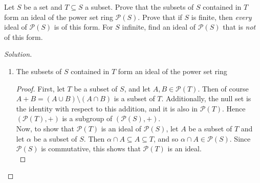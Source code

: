 \documentclass[12pt]{article}
\newenvironment{problem}[2][Problem]{\begin{trivlist}
\item[\hskip \labelsep {\bfseries #1}\hskip \labelsep {\bfseries #2.}]}{\end{trivlist}}
\newenvironment{solution}
  {\renewcommand\qedsymbol{$\blacksquare$}\begin{proof}[Solution]}
{\end{proof}}
\newenvironment{sproof}{
  \renewcommand\qedsymbol{$\square$}
  \begin{proof}
  }{
  \end{proof}
}
\theoremstyle{remark}
\begin{document}
\begin{problem}{3.16}
  Let $S$ be a set and $T\subseteq S$ a subset.
  Prove that the subsets of $S$ contained in $T$ form an ideal of the power set ring 
  $\mathscr{P}(S)$.
  Prove that if $S$ is finite, then \textit{every} ideal of $\mathscr{P}(S)$ is of this form.
  For $S$ infinite, find an ideal of $\mathscr{P}(S)$ that is \textit{not} of this form.
\end{problem}

\begin{solution}\ 
  \begin{enumerate}
    \item The subsets of $S$ contained in $T$ form an ideal of the power set ring 
      \begin{sproof}
        First, let $T$ be a subset of $S$, and let $A,B\in\mathscr{P}(T)$.
        Then of course \\$A+B=(A\cup B)\setminus(A\cap B)$ is a subset of $T$.
        Additionally, the null set is the identity with respect to this addition, and
        it is also in $\mathscr{P}(T)$.
        Hence $(\mathscr{P}(T), +)$ is a subgroup of $(\mathscr{P}(S),+)$.\\
        \indent Now, to show that $\mathscr{P}(T)$ is an ideal of $\mathscr{P}(S)$, let
        $A$ be a subset of $T$ and let $\alpha$ be a subset of $S$. 
        Then $\alpha\cap A\subseteq A\subseteq T$, and so $\alpha\cap A\in\mathscr{P}(S)$.
        Since $\mathscr{P}(S)$ is commutative, this shows that $\mathscr{P}(T)$ is an ideal.\\
      \end{sproof}


\end{enumerate}
\end{solution}
\end{document}
